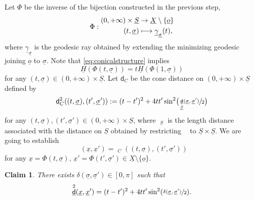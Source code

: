 \documentclass[10pt]{amsart}
\newcommand\mto{\mathchoice{\longmapsto}{\mapsto}{\mapsto}{\mapsto}}
\let\backslash\setminus
\theoremstyle{plain}
\newtheorem{claim}[theorem]{Claim}
\theoremstyle{definition}
\newcommand{\dist}{\mathsf{d}}
\newcommand{\uX}{\underline{X}}
\newcommand{\usigma}{\underline{\sigma}}
\DeclareMathOperator{\udist}{\underline{\dist}}
\newcommand{\uo}{\underline{o}}
\newcommand{\ux}{\underline{x}}
\newcommand{\uH}{\underline{H}}
\newcommand{\uS}{\underline{S}}
\newcommand{\ugamma}{\underline{\gamma}}
\begin{document}
Let $\Phi$ be the inverse of the bijection constructed in the previous step, \ie
\[
\Phi: \begin{aligned}
(0,+\infty) \times \uS & \to \uX \backslash\{\uo\} \\
(t,\usigma) & \mto \ugamma_{\usigma}(t),
\end{aligned}
\]
where $\ugamma_{\usigma}$ is the geodesic ray obtained by extending the minimizing geodesic joining $\uo$ to $\usigma$. Note that \eqref{eq:conicalstructure} implies
\begin{equation}\label{eq:conicalstructure2}
\uH(\Phi(t,\usigma))= t\uH(\Phi(1,\usigma))
\end{equation}
for any $(t,\usigma)\in (0,+\infty) \times \uS$. Let $\dist_C$ be the cone distance on $(0,+\infty)\times \uS$ defined by
\[
\dist_C^2((t,\usigma),(t',\usigma')):=(t-t')^2 + 4 t t' \sin^2\bigl(\sfrac{\udist_{\uS}(\usigma,\usigma')}{2}\bigr)
\]
for any $(t,\usigma),(t',\usigma') \in (0,+\infty) \times \uS$, where $\udist_{\uS}$ is the length distance associated with the distance on $\uS$ obtained by restricting $\udist$ to $\uS \times \uS$. We are going to establish
\begin{equation}\label{eq:isometry}
\udist(\ux,\ux') = \udist_C((t,\usigma),(t',\usigma'))
\end{equation}
for any $\ux = \Phi(t,\usigma), \, \ux' = \Phi(t',\usigma') \in \uX \backslash \{\uo\}$.

\begin{claim}\label{claim:isometrywithdelta}
There exists $\delta(\usigma,\usigma') \in [0,\pi]$ such that
\begin{equation}\label{eq:coeur2}
\udist^2(\ux,\ux') = (t-t')^2 + 4 tt' \sin^2(\sfrac{\delta(\usigma,\usigma')}{2}).
\end{equation}
\end{claim}
\end{document}

